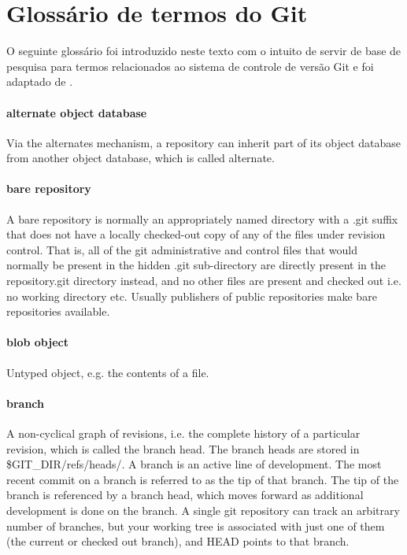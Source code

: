 \chapter{Glossário de termos do Git}

O seguinte glossário foi introduzido neste texto com o intuito de servir de base de pesquisa para termos relacionados ao sistema de controle de versão Git e foi adaptado de \cite{git_glossary}.

\subsubsection{alternate object database}

Via the alternates mechanism, a repository can inherit part of its object database from another object database, which is called alternate.

\subsubsection{bare repository}

A bare repository is normally an appropriately named directory with a .git suffix that does not have a locally checked-out copy of any of the files under revision control. That is, all of the git administrative and control files that would normally be present in the hidden .git sub-directory are directly present in the repository.git directory instead, and no other files are present and checked out i.e. no working directory etc. Usually publishers of public repositories make bare repositories available.

\subsubsection{blob object}

Untyped object, e.g. the contents of a file.

\subsubsection{branch}

A non-cyclical graph of revisions, i.e. the complete history of a particular revision, which is called the branch head. The branch heads are stored in \$GIT\_DIR/refs/heads/.
A branch is an active line of development. The most recent commit on a branch is referred to as the tip of that branch. The tip of the branch is referenced by a branch head, which moves forward as additional development is done on the branch. A single git repository can track an arbitrary number of branches, but your working tree is associated with just one of them (the current or checked out branch), and HEAD points to that branch.

